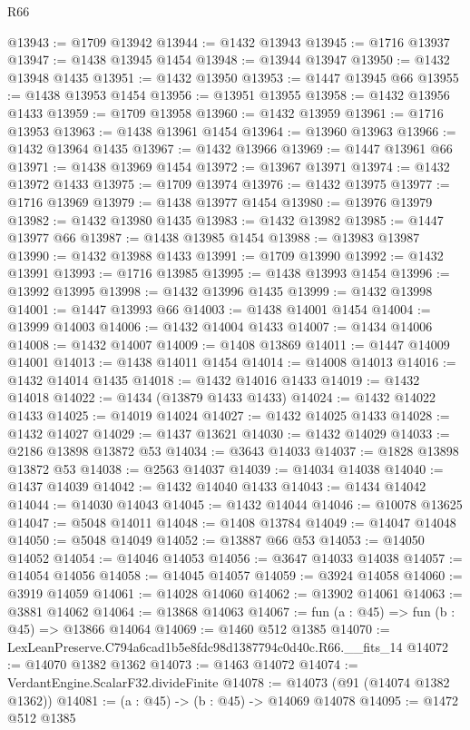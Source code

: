 \begin{lexlean}{R66}
\begin{coremodule}
@13943 := @1709 @13942
@13944 := @1432 @13943
@13945 := @1716 @13937
@13947 := @1438 @13945 @1454
@13948 := @13944 @13947
@13950 := @1432 @13948 @1435
@13951 := @1432 @13950
@13953 := @1447 @13945 @66
@13955 := @1438 @13953 @1454
@13956 := @13951 @13955
@13958 := @1432 @13956 @1433
@13959 := @1709 @13958
@13960 := @1432 @13959
@13961 := @1716 @13953
@13963 := @1438 @13961 @1454
@13964 := @13960 @13963
@13966 := @1432 @13964 @1435
@13967 := @1432 @13966
@13969 := @1447 @13961 @66
@13971 := @1438 @13969 @1454
@13972 := @13967 @13971
@13974 := @1432 @13972 @1433
@13975 := @1709 @13974
@13976 := @1432 @13975
@13977 := @1716 @13969
@13979 := @1438 @13977 @1454
@13980 := @13976 @13979
@13982 := @1432 @13980 @1435
@13983 := @1432 @13982
@13985 := @1447 @13977 @66
@13987 := @1438 @13985 @1454
@13988 := @13983 @13987
@13990 := @1432 @13988 @1433
@13991 := @1709 @13990
@13992 := @1432 @13991
@13993 := @1716 @13985
@13995 := @1438 @13993 @1454
@13996 := @13992 @13995
@13998 := @1432 @13996 @1435
@13999 := @1432 @13998
@14001 := @1447 @13993 @66
@14003 := @1438 @14001 @1454
@14004 := @13999 @14003
@14006 := @1432 @14004 @1433
@14007 := @1434 @14006
@14008 := @1432 @14007
@14009 := @1408 @13869
@14011 := @1447 @14009 @14001
@14013 := @1438 @14011 @1454
@14014 := @14008 @14013
@14016 := @1432 @14014 @1435
@14018 := @1432 @14016 @1433
@14019 := @1432 @14018
@14022 := @1434 (@13879 @1433 @1433)
@14024 := @1432 @14022 @1433
@14025 := @14019 @14024
@14027 := @1432 @14025 @1433
@14028 := @1432 @14027
@14029 := @1437 @13621
@14030 := @1432 @14029
@14033 := @2186 @13898 @13872 @53
@14034 := @3643 @14033
@14037 := @1828 @13898 @13872 @53
@14038 := @2563 @14037
@14039 := @14034 @14038
@14040 := @1437 @14039
@14042 := @1432 @14040 @1433
@14043 := @1434 @14042
@14044 := @14030 @14043
@14045 := @1432 @14044
@14046 := @10078 @13625
@14047 := @5048 @14011
@14048 := @1408 @13784
@14049 := @14047 @14048
@14050 := @5048 @14049
@14052 := @13887 @66 @53
@14053 := @14050 @14052
@14054 := @14046 @14053
@14056 := @3647 @14033 @14038
@14057 := @14054 @14056
@14058 := @14045 @14057
@14059 := @3924 @14058
@14060 := @3919 @14059
@14061 := @14028 @14060
@14062 := @13902 @14061
@14063 := @3881 @14062
@14064 := @13868 @14063
@14067 := fun (a : @45) => fun (b : @45) => @13866 @14064
@14069 := @1460 @512 @1385
@14070 := LexLeanPreserve.C794a6cad1b5e8fdc98d1387794c0d40c.R66.__fits_14
@14072 := @14070 @1382 @1362
@14073 := @1463 @14072
@14074 := VerdantEngine.ScalarF32.divideFinite
@14078 := @14073 (@91 (@14074 @1382 @1362))
@14081 := (a : @45) -> (b : @45) -> @14069 @14078
@14095 := @1472
    @512
    @1385

\end{coremodule}
\end{lexlean}
